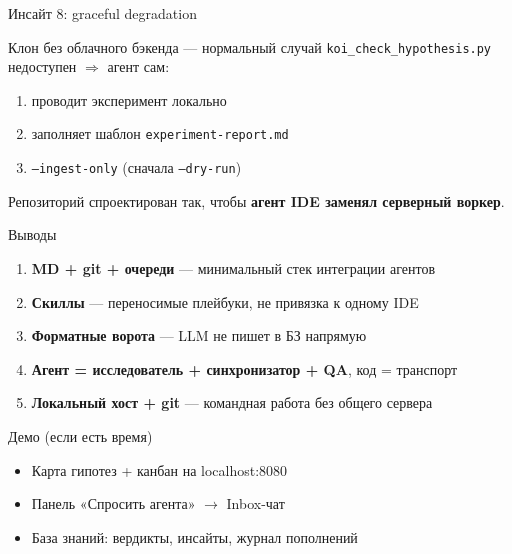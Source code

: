 \documentclass[aspectratio=169,11pt]{beamer}
\begin{document}
\begin{frame}{Инсайт 8: graceful degradation}
  \begin{block}{Клон без облачного бэкенда --- нормальный случай}
    \texttt{koi\_check\_hypothesis.py} недоступен $\Rightarrow$ агент сам:
  \end{block}
  \begin{enumerate}
    \item проводит эксперимент локально
    \item заполняет шаблон \texttt{experiment-report.md}
    \item \texttt{--ingest-only} (сначала \texttt{--dry-run})
  \end{enumerate}
  Репозиторий спроектирован так, чтобы \textbf{агент IDE заменял серверный воркер}.
\end{frame}

\begin{frame}{Выводы}
  \begin{enumerate}
    \item \textbf{MD + git + очереди} --- минимальный стек интеграции агентов
    \item \textbf{Скиллы} --- переносимые плейбуки, не привязка к одному IDE
    \item \textbf{Форматные ворота} --- LLM не пишет в БЗ напрямую
    \item \textbf{Агент = исследователь + синхронизатор + QA}, код = транспорт
    \item \textbf{Локальный хост + git} --- командная работа без общего сервера
  \end{enumerate}
\end{frame}

\begin{frame}{Демо (если есть время)}
  \begin{itemize}
    \item Карта гипотез + канбан на localhost:8080
    \item Панель «Спросить агента» $\rightarrow$ Inbox-чат
    \item База знаний: вердикты, инсайты, журнал пополнений
  \end{itemize}
\end{frame}
\end{document}
